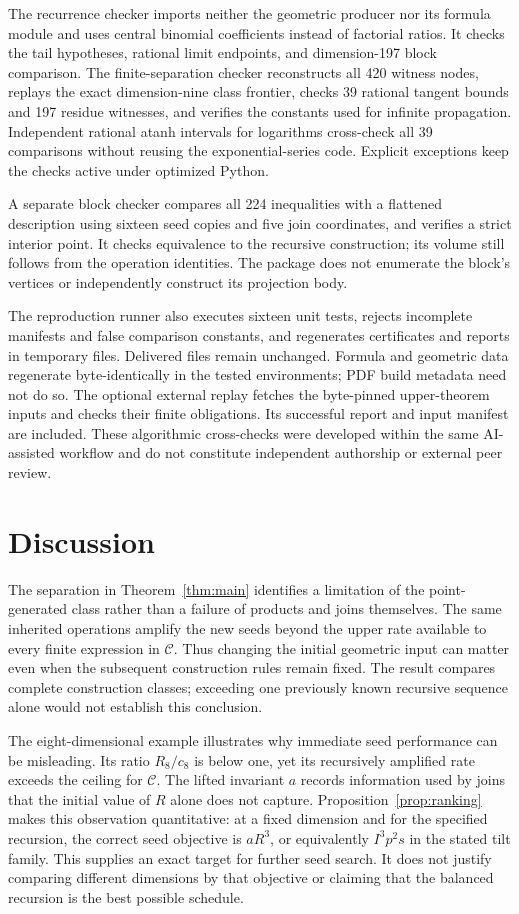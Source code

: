 \documentclass[11pt]{article}
\newcommand{\CC}{\mathcal C}
\begin{document}
The recurrence checker imports neither the geometric producer nor its
formula module and uses central binomial coefficients instead of factorial
ratios. It checks the tail hypotheses, rational limit endpoints, and
dimension-197 block comparison. The finite-separation checker reconstructs
all 420 witness nodes, replays the exact dimension-nine class frontier,
checks 39 rational tangent bounds and 197 residue witnesses, and verifies
the constants used for infinite propagation. Independent rational atanh
intervals for logarithms cross-check all 39 comparisons without reusing
the exponential-series code. Explicit exceptions keep the checks active
under optimized Python.

A separate block checker compares all 224 inequalities with a flattened
description using sixteen seed copies and five join coordinates, and
verifies a strict interior point. It checks equivalence to the recursive
construction; its volume still follows from the operation identities.
The package does not enumerate the block's vertices or independently
construct its projection body.

The reproduction runner also executes sixteen unit tests, rejects
incomplete manifests and false comparison constants, and regenerates
certificates and reports in temporary files. Delivered files remain
unchanged. Formula and geometric data regenerate byte-identically in the
tested environments; PDF build metadata need not do so. The optional
external replay fetches the byte-pinned upper-theorem inputs and checks
their finite obligations. Its successful report and input manifest are
included. These algorithmic cross-checks were developed within the same
AI-assisted workflow and do not constitute independent authorship or
external peer review.

\section{Discussion}
The separation in Theorem~\ref{thm:main} identifies a limitation of the
point-generated class rather than a failure of products and joins
themselves. The same inherited operations amplify the new seeds beyond
the upper rate available to every finite expression in $\CC$.
Thus changing the initial geometric input can matter even when the
subsequent construction rules remain fixed. The result compares complete
construction classes; exceeding one previously known recursive sequence
alone would not establish this conclusion.

The eight-dimensional example illustrates why immediate seed performance
can be misleading. Its ratio $R_8/c_8$ is below one, yet its recursively
amplified rate exceeds the ceiling for $\CC$. The lifted invariant $a$
records information used by joins that the initial value of $R$ alone
does not capture. Proposition~\ref{prop:ranking} makes this observation
quantitative: at a fixed dimension and for the specified recursion, the
correct seed objective is $aR^3$, or equivalently $I^3p^2s$ in the stated
tilt family. This supplies an exact target for further seed search.
It does not justify comparing different dimensions by that objective or
claiming that the balanced recursion is the best possible schedule.
\end{document}
